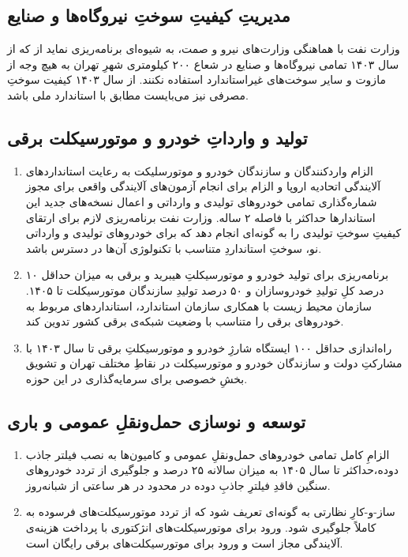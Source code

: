 \documentclass[12pt]{atu}
\begin{document}
\subsection{مدیریتِ کیفیتِ سوختِ نیروگاه‌ها و صنایع}
وزارت نفت با هماهنگی وزارت‌های نیرو و صمت، به شیوه‌ای برنامه‌ریزی نماید از که از سال ۱۴۰۳ تمامی نیروگاه‌ها و صنایع در شعاع ۲۰۰ کیلومتری شهرِ تهران به هیچ وجه از مازوت و سایر سوخت‌های غیراستاندارد استفاده نکنند. از سال ۱۴۰۳ کیفیت سوختِ مصرفی نیز می‌بایست مطابق با استاندارد ملی باشد.
\subsection{تولید و وارداتِ خودرو و موتورسیکلت برقی}
\begin{enumerate}
		\item
 الزام واردکنندگان و  سازندگان خودرو و موتورسلیکت به رعایت  استانداردهای آلایندگی  اتحادیه اروپا و الزام برای انجام آزمون‌های آلایندگی واقعی برای مجوز شماره‌گذاری تمامی خودروهای تولیدی و وارداتی و اعمال نسخه‌های جدید این استاندارها حداکثر با فاصله ۲ ساله. وزارت نفت برنامه‌ریزی لازم برای ارتقای کیفیتِ سوختِ تولیدی را به گونه‌ای انجام دهد که برای خودروهای تولیدی و وارداتی نو، سوختِ استانداردِ متناسب با تکنولوژی ‌آن‌ها در دسترس باشد.
 \item 
برنامه‌ریزی برای تولید خودرو و موتورسیکلتِ هیبرید و  برقی به میزان حداقل ۱۰ درصد کلِ تولیدِ خودروسازان و ۵۰ درصد تولیدِ سازندگان موتورسیکلت تا ۱۴۰۵. سازمان محیط زیست با همکاری سازمان استاندارد، استانداردهای مربوط به خودروهای برقی را متناسب با وضعیت شبکه‌ی برقی کشور تدوین کند.
\item 
راه‌اندازی حداقل ۱۰۰ ایستگاه شارژِ خودرو و موتورسیکلتِ برقی تا سال ۱۴۰۳ با مشارکتِ دولت و سازندگان خودرو و موتورسیکلت در نقاطِ مختلف تهران و تشویق بخشِ خصوصی برای سرمایه‌گذاری در این حوزه.
\end{enumerate}

\subsection{توسعه و نوسازی حمل‌و‌نقلِ عمومی و باری}
\begin{enumerate}
	\item 
	الزامِ کامل تمامی خودروهای حمل‌ونقلِ عمومی و کامیون‌ها به نصب فیلتر جاذب دوده،حداکثر تا سال ۱۴۰۵ به میزان سالانه ۲۵ درصد و جلوگیری از تردد خودروهای سنگین فاقدِ فیلترِ جاذبِ دوده در محدود
در هر ساعتی از شبانه‌روز.
\item 
ساز-و-کارِ نظارتی به گونه‌ای تعریف شود که از تردد موتورسیکلت‌های فرسوده به
 کاملاً جلوگیری شود. ورود برای موتورسیکلت‌های انژکتوری با پرداخت هزینه‌‌ی آلایندگی مجاز است و ورود برای موتورسیکلت‌های برقی رایگان است.
\end{enumerate}
\end{document}
